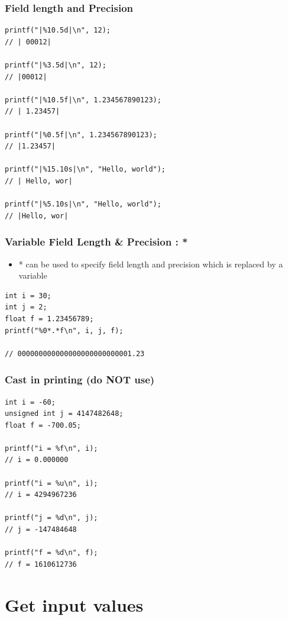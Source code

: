 \documentclass{../c-lecture}
\begin{document}
\begin{frame}[fragile]
  \frametitle{Field length and Precision}
  \begin{verbatim}
printf("|%10.5d|\n", 12);
// | 00012|

printf("|%3.5d|\n", 12);
// |00012|

printf("|%10.5f|\n", 1.234567890123);
// | 1.23457|

printf("|%0.5f|\n", 1.234567890123);
// |1.23457|

printf("|%15.10s|\n", "Hello, world");
// | Hello, wor|

printf("|%5.10s|\n", "Hello, world");
// |Hello, wor|
  \end{verbatim}
\end{frame}

\begin{frame}[fragile]
  \frametitle{Variable Field Length \& Precision : *}
  \begin{itemize}
    \item
      * can be used to specify field length and precision which is replaced by a
      variable

  \end{itemize}
  \begin{verbatim}
int i = 30;
int j = 2;
float f = 1.23456789;
printf("%0*.*f\n", i, j, f);

// 000000000000000000000000001.23
  \end{verbatim}
\end{frame}

\begin{frame}[fragile]
  \frametitle{Cast in printing (do NOT use)}
  \begin{verbatim}
int i = -60;
unsigned int j = 4147482648;
float f = -700.05;

printf("i = %f\n", i);
// i = 0.000000

printf("i = %u\n", i);
// i = 4294967236

printf("j = %d\n", j);
// j = -147484648

printf("f = %d\n", f);
// f = 1610612736
  \end{verbatim}
\end{frame}

\section{Get input values}
\end{document}

